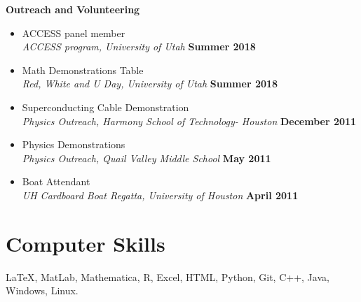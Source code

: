 \documentclass[margin,line]{res}
\begin{document}
\begin{resume}
{\bf Outreach and Volunteering}
\begin{itemize}
    \item[ ] ACCESS panel member 
    \\ {\it ACCESS program, University of Utah} \hfill {\bf Summer 2018}
    \item[ ] Math Demonstrations Table
    \\ {\it Red, White and U Day, University of Utah} \hfill {\bf Summer 2018}
    \item[ ] Superconducting Cable Demonstration
    \\ {\it Physics Outreach, Harmony School of Technology- Houston} \hfill {\bf December 2011}
    \item[ ] Physics Demonstrations
    \\ {\it Physics Outreach, Quail Valley Middle School} \hfill {\bf May 2011}
    \item[ ] Boat Attendant
    \\ {\it UH Cardboard Boat Regatta, University of Houston} \hfill {\bf April 2011}
\end{itemize}



\section{\sc Computer Skills} 
\LaTeX, MatLab, Mathematica, R, Excel, HTML, Python, Git, C++, Java, Windows, Linux.


\end{resume}
\end{document}
